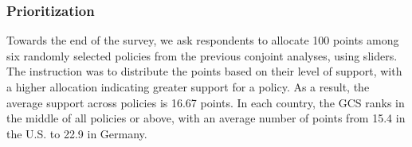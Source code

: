 \begin{bibunit}




\subsubsection{Prioritization}\label{subsubsec:prioritization} %

Towards the end of the survey, we ask respondents to allocate 100 points among six randomly selected policies from the previous conjoint analyses, using sliders. The instruction was to distribute the points based on their level of support, with a higher allocation indicating greater support for a policy. %
As a result, the average support across policies is 16.67 points. %
In each country, the GCS ranks in the middle of all policies or above, with an average number of points from 15.4 in the U.S. to 22.9 in Germany.%


\end{bibunit}

